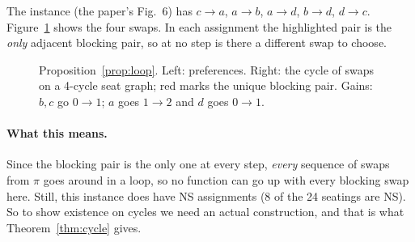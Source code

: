 \documentclass[11pt,a4paper]{article}
\theoremstyle{definition}
\theoremstyle{remark}
\theoremstyle{plain}
\newcommand{\figsixpref}{%
  \node[aga] (a) at (0,1.6) {a}; \node[agc] (c) at (2.1,1.6) {c};
  \node[agb] (b) at (0,0) {b};   \node[agd] (d) at (2.1,0) {d};
  \draw[arc] (c) -- (a); \draw[arc] (a) -- (b); \draw[arc] (a) -- (d);
  \draw[arc] (b) -- (d); \draw[arc] (d) -- (c);}
\newcommand{\sqseat}[6]{%
  \coordinate (#1) at (0,1.3); \coordinate (#2) at (1.3,1.3);
  \coordinate (#3) at (1.3,0); \coordinate (#4) at (0,0);
  \draw[sedge] (#1)--(#2)--(#3)--(#4)--cycle;
  \draw[hot] (#5)--(#6);
  \node[ag#1] (#1) at (#1) {#1}; \node[ag#2] (#2) at (#2) {#2};
  \node[ag#3] (#3) at (#3) {#3}; \node[ag#4] (#4) at (#4) {#4};}
\begin{document}
The instance (the paper's Fig.~6) has $c\to a$, $a\to b$, $a\to d$, $b\to d$, $d\to c$. Figure~\ref{fig:loop} shows the four swaps. In each assignment the highlighted pair is the \emph{only} adjacent blocking pair, so at no step is there a different swap to choose.

\begin{figure}[h]
\centering
{}
\caption{Proposition~\ref{prop:loop}. Left: preferences. Right: the cycle of swaps on a 4-cycle seat graph; red marks the unique blocking pair. Gains: $b,c$ go $0\to1$; $a$ goes $1\to2$ and $d$ goes $0\to1$.}
\label{fig:loop}
\end{figure}

\paragraph{What this means.} Since the blocking pair is the only one at every step, \emph{every} sequence of swaps from $\pi$ goes around in a loop, so no function can go up with every blocking swap here. Still, this instance does have NS assignments (8 of the 24 seatings are NS). So to show existence on cycles we need an actual construction, and that is what Theorem~\ref{thm:cycle} gives.
\end{document}
